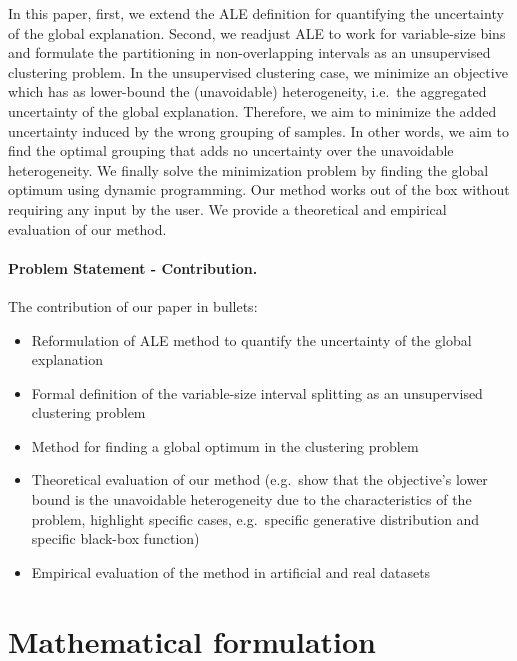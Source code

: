 \documentclass{article}
\begin{document}
In this paper, first, we extend the ALE definition for quantifying the uncertainty of the global explanation.
Second, we readjust ALE to work for variable-size bins and formulate the partitioning in non-overlapping intervals as an unsupervised clustering problem.
In the unsupervised clustering case, we minimize an objective which has as lower-bound the (unavoidable) heterogeneity, i.e.\ the aggregated uncertainty of the global explanation.
Therefore, we aim to minimize the added uncertainty induced by the wrong grouping of samples.
In other words, we aim to find the optimal grouping that adds no uncertainty over the unavoidable heterogeneity.
We finally solve the minimization problem by finding the global optimum using dynamic programming.
Our method works out of the box without requiring any input by the user.
We provide a theoretical and empirical evaluation of our method.

\paragraph{Problem Statement - Contribution.} The contribution of our
paper in bullets:

\begin{itemize}
\item Reformulation of ALE method to quantify the uncertainty of the
  global explanation
\item Formal definition of the variable-size interval splitting as an
  unsupervised clustering problem
\item Method for finding a global optimum in the clustering
  problem
\item Theoretical evaluation of our method (e.g.~show that the
  objective's lower bound is the unavoidable heterogeneity due to the
  characteristics of the problem, highlight specific cases,
  e.g.\ specific generative distribution and specific black-box function)
\item Empirical evaluation of the method in artificial and real
  datasets
\end{itemize}

\section{Mathematical formulation}
\label{sec:mathematical-formulation}
\end{document}

